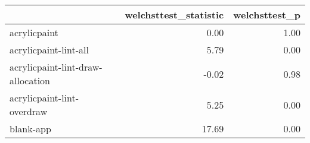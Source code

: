 \begin{tabular}{lrr}
\toprule
{} &  welchsttest\_statistic &  welchsttest\_p \\
\midrule
acrylicpaint                      &                   0.00 &           1.00 \\
acrylicpaint-lint-all             &                   5.79 &           0.00 \\
acrylicpaint-lint-draw-allocation &                  -0.02 &           0.98 \\
acrylicpaint-lint-overdraw        &                   5.25 &           0.00 \\
blank-app                         &                  17.69 &           0.00 \\
\bottomrule
\end{tabular}
